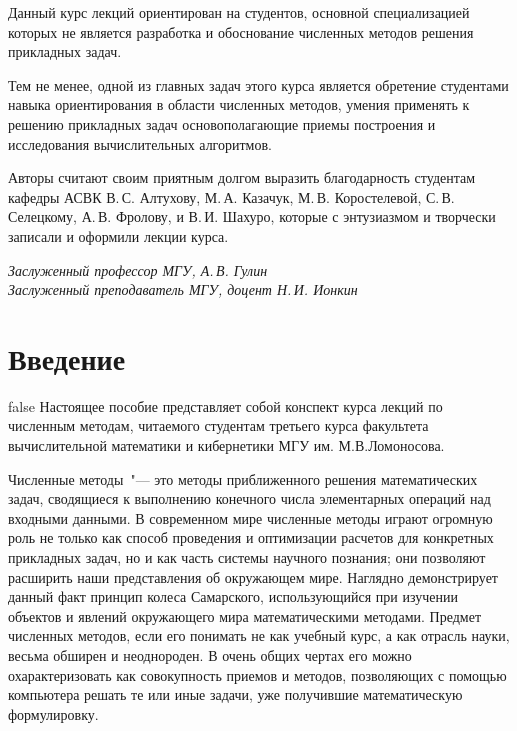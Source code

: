 \documentclass[11pt,a4paper,twoside,listtotoc,bibtotoc]{report}
\numberwithin{equation}{section}
\theoremstyle{definition}
\theoremstyle{plain}
\begin{document}
Данный курс лекций ориентирован на студентов, основной специализацией которых
не является разработка и обоснование численных методов решения прикладных
задач.

Тем не менее, одной из главных задач этого курса является обретение
студентами навыка ориентирования в области численных методов, умения применять
к решению прикладных задач основополагающие приемы построения и исследования
вычислительных алгоритмов.

Авторы считают своим приятным долгом выразить благодарность студентам кафедры
АСВК В.\,С. Алтухову, М.\,А. Казачук, М.\,В. Коростелевой, С.\,В. Селецкому,
А.\,В. Фролову, и В.\,И. Шахуро, которые с энтузиазмом и творчески записали
и оформили лекции курса.

\begin{flushright}
    \textit{Заслуженный профессор МГУ, А.\,В. Гулин}\\
    \textit{Заслуженный преподаватель МГУ, доцент Н.\,И. Ионкин}\\
\end{flushright}

%
\newpage
{}
\pagestyle{empty}
%
\chapter*{Введение}
%
\vspace{0.5cm}
\ifx false
Настоящее пособие представляет собой конспект курса лекций по численным
методам, читаемого студентам третьего курса факультета вычислительной
математики и кибернетики МГУ им. М.В.Ломоносова.

Численные методы~"--- это методы приближенного решения математических задач,
сводящиеся к выполнению конечного числа элементарных операций над входными
данными.  В современном мире численные методы играют огромную роль не только
как способ проведения и оптимизации расчетов для конкретных прикладных задач,
но и как часть системы научного познания; они позволяют расширить наши представления
об окружающем мире. Наглядно демонстрирует данный факт принцип колеса Самарского,
использующийся при изучении объектов и явлений окружающего мира математическими
методами.
\fi
Предмет численных методов, если его понимать не как учебный курс, а как отрасль
науки, весьма обширен и неоднороден. В очень общих чертах его можно охарактеризовать
как совокупность приемов и методов, позволяющих с помощью компьютера решать те или
иные задачи, уже получившие математическую формулировку.
\end{document}
